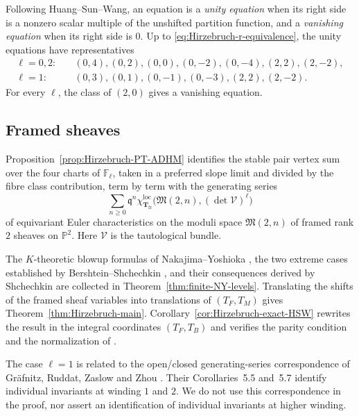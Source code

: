 \documentclass{amsart}
\theoremstyle{definition}
\numberwithin{equation}{section}
\newcommand{\cV}{\mathcal V}
\newcommand{\M}{\mathfrak M}
\begin{document}
Following Huang--Sun--Wang, an equation is a \emph{unity equation} when its right side is a nonzero scalar multiple of the unshifted partition function, and a \emph{vanishing equation} when its right side is \(0\).  Up to \eqref{eq:Hirzebruch-r-equivalence}, the unity equations have representatives
\[
\begin{aligned}
 \ell=0,2:\quad&
 (0,4),(0,2),(0,0),(0,-2),(0,-4),(2,2),(2,-2),\\
 \ell=1:\quad&
 (0,3),(0,1),(0,-1),(0,-3),(2,2),(2,-2).
\end{aligned}
\]
For every \(\ell\), the class of \((2,0)\) gives a vanishing equation.

\subsection{Framed sheaves}
Proposition~\ref{prop:Hirzebruch-PT-ADHM} identifies the stable pair vertex sum over the four charts of \(\mathbb F_\ell\), taken in a preferred slope limit and divided by the fibre class contribution, term by term with the generating series
\[
 \sum_{n\geq0}\mathfrak q^n
 \chi_{\mathbf T_{\mathrm{fr}}}^{\mathrm{loc}}
 \bigl(\M(2,n),(\det\cV)^\ell\bigr)
\]
of equivariant Euler characteristics on the moduli space \(\M(2,n)\) of framed rank \(2\) sheaves on \(\mathbb P^2\).  Here \(\cV\) is the tautological bundle.

The \(K\)-theoretic blowup formulas of Nakajima--Yoshioka \cite{NakajimaYoshiokaII,NakajimaYoshiokaPerverse}, the two extreme cases established by Bershtein--Shchechkin \cite{BershteinShchechkin}, and their consequences derived by Shchechkin \cite{Shchechkin} are collected in Theorem~\ref{thm:finite-NY-levels}.  Translating the shifts of the framed sheaf variables into translations of \((T_F,T_M)\) gives Theorem~\ref{thm:Hirzebruch-main}.  Corollary~\ref{cor:Hirzebruch-exact-HSW} rewrites the result in the integral coordinates \((T_F,T_B)\) and verifies the parity condition and the normalization of \cite{HuangSunWang}.

The case \(\ell=1\) is related to the open/closed generating-series correspondence of Gr\"afnitz, Ruddat, Zaslow and Zhou \cite[Theorem~5.3]{GraefnitzRuddatZaslowZhou}.  Their Corollaries~5.5 and~5.7 identify individual invariants at winding \(1\) and \(2\).  We do not use this correspondence in the proof, nor assert an identification of individual invariants at higher winding.
\end{document}

